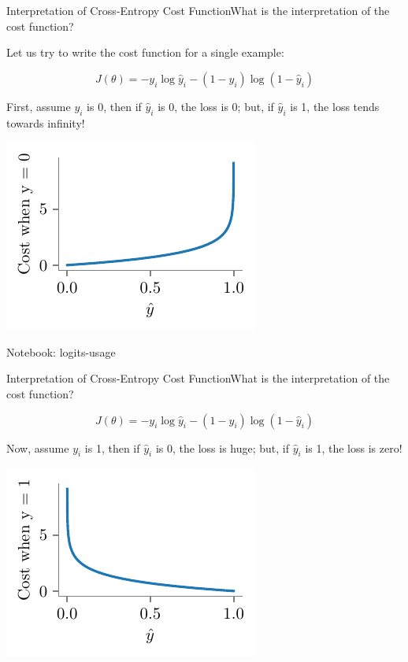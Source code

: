 \documentclass{beamer}
\begin{document}
\begin{frame}{Interpretation of Cross-Entropy Cost Function}\pause What is the interpretation of the cost function?

\pause Let us try to write the cost function for a single example:

\pause $$J(\theta) = -y_i\log{\hat{y}_i} - (1-y_i)\log({1-\hat{y}_i})$$

\pause First, assume $y_i$ is 0, then if $\hat{y}_i$ is 0, the loss is 0; but, if $\hat{y}_i$ is 1, the loss tends towards infinity!

	\includegraphics[scale=0.7]{../assets/logistic-regression/figures/logistic-cross-cost-0}


\end{frame}

\begin{frame}
	Notebook: logits-usage
\end{frame}

\begin{frame}{Interpretation of Cross-Entropy Cost Function}\pause What is the interpretation of the cost function?



 $$J(\theta) = -y_i\log{\hat{y}_i} - (1-y_i)\log({1-\hat{y}_i})$$

\pause Now, assume $y_i$ is 1, then if $\hat{y}_i$ is 0, the loss is huge; but, if $\hat{y}_i$ is 1, the loss is zero!

\includegraphics[scale=0.7]{../assets/logistic-regression/figures/logistic-cross-cost-1}


\end{frame}
\end{document}
